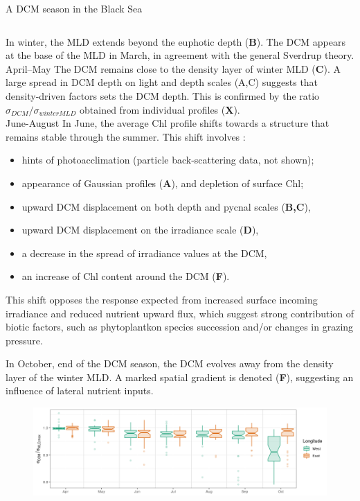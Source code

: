 \documentclass[final]{beamer}
\begin{document}
\begin{frame}[fragile]
\begin{columns}[T]
\begin{column}{.64\textwidth}
\begin{block}{ A DCM season in the Black Sea }
\begin{columns}[T]
\begin{column}{.42\textwidth}
\alert{In winter}, the MLD extends beyond the euphotic depth (\textbf{B}).
The DCM appears at the base of the MLD in March, in agreement with the general Sverdrup theory.\\

\vspace{5mm}
\alert{April–May} The DCM remains close to the density layer of winter MLD (\textbf{C}). A large spread in DCM depth on light and depth scales (A,C) suggests that density-driven factors sets the DCM depth. This is confirmed by the ratio $\sigma_{DCM}/\sigma_{winter MLD}$ obtained from individual profiles (\textbf{X}).\\

\vspace{5mm}
\alert{June-August} In June, the average Chl profile shifts towards a structure that remains stable through the summer. This shift involves :
\begin{itemize}[wide, labelwidth=!,labelindent=0pt, label=$\diamond$]
    \item hints of photoacclimation (particle  back-scattering data, not shown);
    \item appearance of Gaussian profiles (\textbf{A}),
and depletion of surface Chl;
   \item upward DCM displacement on both depth and pycnal scales
(\textbf{B,C}),
   \item upward DCM displacement on the irradiance scale (\textbf{D}),
   \item a decrease in the spread of irradiance values at the DCM,  
   \item an increase of Chl content around the DCM (\textbf{F}).
\end{itemize}
 This shift opposes the response expected from increased surface incoming irradiance and reduced nutrient upward flux, which suggest strong contribution of biotic factors, such as phytoplantkon species succession \cite{Mikaelyan2018} and/or changes in grazing pressure. \\
 
\vspace{5mm}

\alert{In October}, end of the DCM season, the DCM evolves away from the density layer of the  winter MLD. A marked spatial gradient is denoted (\textbf{F}), suggesting an influence of lateral nutrient inputs. 
 
 		    \begin{figure}
     		    \includegraphics[width=.8\columnwidth]{figs/FIG8.png}
		    \end{figure}
 

\end{column}
\end{columns}
\end{block}
\end{column}
\end{columns}
\end{frame}
\end{document}
